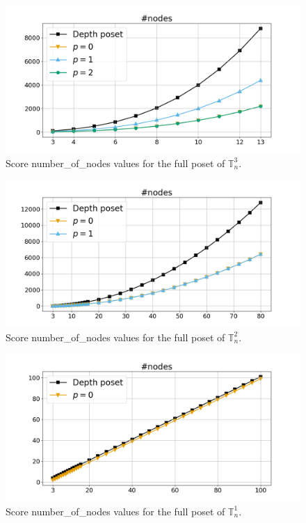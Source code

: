 \documentclass{article}
\begin{document}
    \begin{figure}[h!]
        \centering
        \hspace*{-0.24\textwidth}
        \includegraphics[width=1.4\textwidth]{pics/extended torus scores/score=number-of-nodes, dim=3, object=full.png}
        \caption{Score number\_of\_nodes values for the full poset of $\mathbb{T}_n^{3}$.}
        \label{fig:numberofnodes-full3}
    \end{figure}
    \begin{figure}[h!]
        \centering
        \hspace*{-0.24\textwidth}
        \includegraphics[width=1.4\textwidth]{pics/extended torus scores/score=number-of-nodes, dim=2, object=full.png}
        \caption{Score number\_of\_nodes values for the full poset of $\mathbb{T}_n^{2}$.}
        \label{fig:numberofnodes-full2}
    \end{figure}
    \begin{figure}[h!]
        \centering
        \hspace*{-0.24\textwidth}
        \includegraphics[width=1.4\textwidth]{pics/extended torus scores/score=number-of-nodes, dim=1, object=full.png}
        \caption{Score number\_of\_nodes values for the full poset of $\mathbb{T}_n^{1}$.}
        \label{fig:numberofnodes-full1}
    \end{figure}
\end{document}
